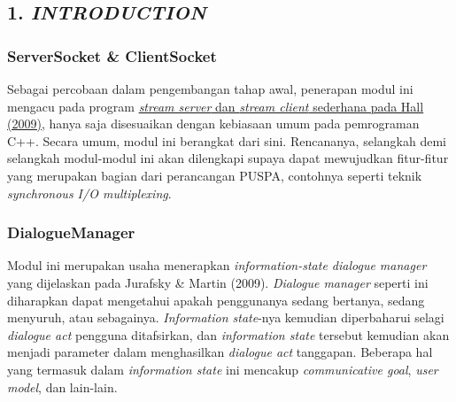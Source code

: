 \subsection*{\textcolor{subsectioncolor}{\textsf{1. \textit{INTRODUCTION}}}}

\subsubsection*{ServerSocket \& ClientSocket}
Sebagai percobaan dalam pengembangan tahap awal,
penerapan modul ini mengacu pada program \href{http://beej.us/guide/bgnet/output/html/multipage/clientserver.html}{\textit{stream server} dan \textit{stream client} sederhana pada Hall (2009)},
hanya saja disesuaikan dengan kebiasaan umum pada pemrograman C++.
Secara umum, modul ini berangkat dari sini.
Rencananya, selangkah demi selangkah modul-modul ini akan dilengkapi supaya dapat mewujudkan fitur-fitur yang merupakan bagian dari perancangan PUSPA,
contohnya seperti teknik \textit{synchronous I/O multiplexing}.

\subsubsection*{DialogueManager}
Modul ini merupakan usaha menerapkan \textit{information-state dialogue manager} yang dijelaskan pada Jurafsky \& Martin (2009).
\textit{Dialogue manager} seperti ini diharapkan dapat mengetahui apakah penggunanya sedang bertanya, sedang menyuruh, atau sebagainya.
\textit{Information state}-nya kemudian diperbaharui selagi \textit{dialogue act} pengguna ditafsirkan,
dan \textit{information state} tersebut kemudian akan menjadi parameter dalam menghasilkan \textit{dialogue act} tanggapan.
Beberapa hal yang termasuk dalam \textit{information state} ini mencakup \textit{communicative goal}, \textit{user model}, dan lain-lain.

